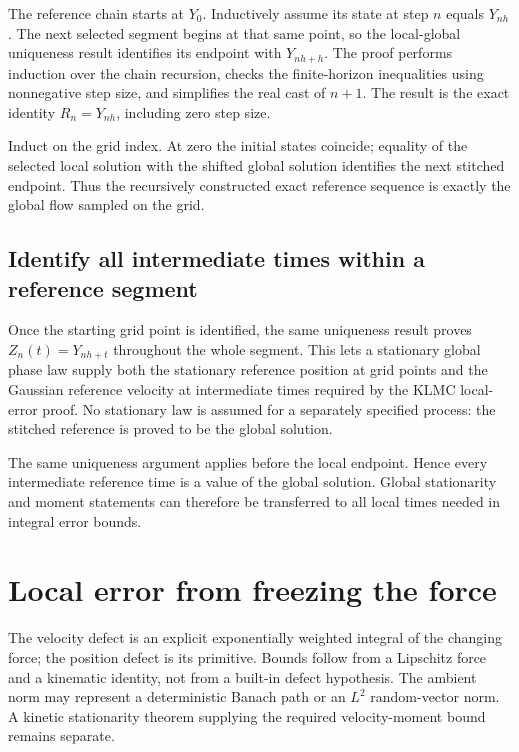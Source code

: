 \documentclass[11pt,a4paper]{report}
\begin{document}
The reference chain starts at \(Y_0\). Inductively assume its state at step \(n\) equals \(Y_{nh}\). The next selected segment begins at that same point, so the local-global uniqueness result identifies its endpoint with \(Y_{nh+h}\). The proof performs induction over the chain recursion, checks the finite-horizon inequalities using nonnegative step size, and simplifies the real cast of \(n+1\). The result is the exact identity \(R_n=Y_{nh}\), including zero step size.



Induct on the grid index. At zero the initial states coincide; equality of the selected local solution with the shifted global solution identifies the next stitched endpoint. Thus the recursively constructed exact reference sequence is exactly the global flow sampled on the grid.

\subsection{\texorpdfstring{Identify all intermediate times within a reference segment}{Identify all intermediate times within a reference segment}}
\label{report-step-KineticLangevin-SegmentGlobal-lean-3}


Once the starting grid point is identified, the same uniqueness result proves \(Z_n(t)=Y_{nh+t}\) throughout the whole segment. This lets a stationary global phase law supply both the stationary reference position at grid points and the Gaussian reference velocity at intermediate times required by the KLMC local-error proof. No stationary law is assumed for a separately specified process: the stitched reference is proved to be the global solution.



The same uniqueness argument applies before the local endpoint. Hence every intermediate reference time is a value of the global solution. Global stationarity and moment statements can therefore be transferred to all local times needed in integral error bounds.

\section{\texorpdfstring{Local error from freezing the force}{Local error from freezing the force}}
\label{proof-module-KineticLangevin-LocalError-lean}


The velocity defect is an explicit exponentially weighted integral of the changing force; the position defect is its primitive. Bounds follow from a Lipschitz force and a kinematic identity, not from a built-in defect hypothesis. The ambient norm may represent a deterministic Banach path or an \(L^{2}\) random-vector norm. A kinetic stationarity theorem supplying the required velocity-moment bound remains separate.
\end{document}
